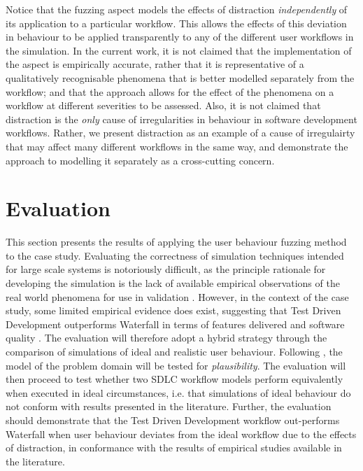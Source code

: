 \documentclass{llncs}
\begin{document}
Notice that the fuzzing aspect models the effects of distraction \emph{independently} of its application to a particular
workflow.  This allows the effects of this deviation in behaviour to be applied transparently to any of the different
user workflows in the simulation. In the current work, it is not claimed that the implementation of the aspect is
empirically accurate, rather that it is representative of a qualitatively recognisable phenomena that is better modelled separately from the workflow; and that the approach
allows for the effect of the phenomena on a workflow at different severities to be assessed.  Also, it is not claimed
that distraction is the \emph{only} cause of irregularities in behaviour in software development workflows.  Rather, we
present distraction as an example of a cause of irregulairty that may affect many different workflows in the same way, and
demonstrate the approach to modelling it separately as a cross-cutting concern.
 

\section{Evaluation}
\label{sec:evaluation}


This section presents the results of applying the user behaviour fuzzing method to the case study.  Evaluating the
correctness of simulation techniques intended for large scale systems is notoriously difficult, as the principle
rationale for developing the simulation is the lack of available empirical observations of the real world phenomena for
use in validation \citet{naylor67verification}.  However, in the context of the case study, some limited empirical
evidence does exist, suggesting that Test Driven Development outperforms Waterfall in terms of features delivered and
software quality
\citep{Bhat2006TestDrivenDevelopment,George2004TestDrivenDevelopment,Huang2009EmpiricalTestFirstProgramming}.  The
evaluation will therefore adopt a hybrid strategy through the comparison of simulations of ideal and realistic user
behaviour. Following \citet{naylor67verification}, the model of the problem domain will be tested for
\emph{plausibility}.  The evaluation will then proceed to test whether two SDLC workflow models perform equivalently
when executed in ideal circumstances, i.e. that simulations of ideal behaviour do not conform with results presented in
the literature. Further, the evaluation should demonstrate that the Test Driven Development workflow out-performs
Waterfall when user behaviour deviates from the ideal workflow due to the effects of distraction, in conformance with
the results of empirical studies available in the literature.
\end{document}
